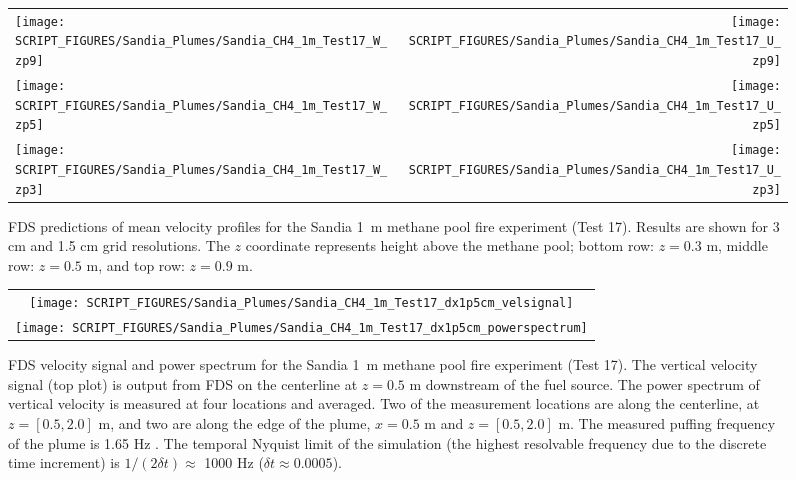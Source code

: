\begin{figure}[p]
\begin{tabular*}{\textwidth}{l@{\extracolsep{\fill}}r}
\texttt{[image: SCRIPT\_FIGURES/Sandia\_Plumes/Sandia\_CH4\_1m\_Test17\_W\_zp9]} &
\texttt{[image: SCRIPT\_FIGURES/Sandia\_Plumes/Sandia\_CH4\_1m\_Test17\_U\_zp9]} \\
\texttt{[image: SCRIPT\_FIGURES/Sandia\_Plumes/Sandia\_CH4\_1m\_Test17\_W\_zp5]} &
\texttt{[image: SCRIPT\_FIGURES/Sandia\_Plumes/Sandia\_CH4\_1m\_Test17\_U\_zp5]} \\
\texttt{[image: SCRIPT\_FIGURES/Sandia\_Plumes/Sandia\_CH4\_1m\_Test17\_W\_zp3]} &
\texttt{[image: SCRIPT\_FIGURES/Sandia\_Plumes/Sandia\_CH4\_1m\_Test17\_U\_zp3]}
\end{tabular*}
\caption[Sandia 1~m methane pool fire (Test 17) mean velocity profiles]
{FDS predictions of mean velocity profiles for the Sandia 1~m methane pool fire experiment (Test 17). Results are shown for 3 cm and 1.5 cm grid resolutions. The $z$ coordinate represents height above the methane pool; bottom row: $z=0.3$ m, middle row: $z=0.5$ m, and top row: $z=0.9$ m.}
\label{Sandia_CH4_1m_Test17_velocity}
\end{figure}

\begin{figure}[p]
\begin{center}
\begin{tabular}{c}
\texttt{[image: SCRIPT\_FIGURES/Sandia\_Plumes/Sandia\_CH4\_1m\_Test17\_dx1p5cm\_velsignal]} \\
\texttt{[image: SCRIPT\_FIGURES/Sandia\_Plumes/Sandia\_CH4\_1m\_Test17\_dx1p5cm\_powerspectrum]}
\end{tabular}
\end{center}
\caption[Sandia 1~m methane pool fire velocity signal and power spectrum]
{FDS velocity signal and power spectrum for the Sandia 1~m methane pool fire experiment (Test 17).  The vertical velocity signal (top plot) is output from FDS on the centerline at $z=0.5$ m downstream of the fuel source.  The power spectrum of vertical velocity is measured at four locations and averaged.  Two of the measurement locations are along the centerline, at $z=[0.5, 2.0]$ m, and two are along the edge of the plume, $x = 0.5$ m and $z=[0.5, 2.0]$ m.  The measured puffing frequency of the plume is 1.65 Hz \cite{Tieszen:2002}.  The temporal Nyquist limit of the simulation (the highest resolvable frequency due to the discrete time increment) is $1/(2\delta t) \approx$ 1000 Hz ($\delta t \approx 0.0005$).}
\label{Sandia_CH4_1m_Test17_spectrum}
\end{figure}

